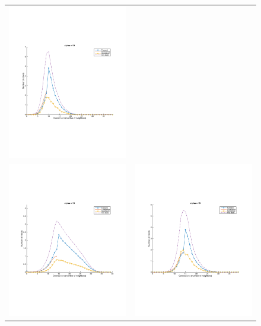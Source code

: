 \documentclass[a4paper, 10pt, conference]{ieeeconf}
\begin{document}
\begin{figure}[p]
\begin{center}
\begin{tabular}{lr}
        \includegraphics[width=8cm]{figures/macroscopic-40-alpha-10.pdf} \\
        \includegraphics[width=8cm]{figures/simulation-40-alpha-15.pdf}  &
        \includegraphics[width=8cm]{figures/macroscopic-40-alpha-15.pdf}

\end{tabular}
\end{center}
\end{figure}
\end{document}
